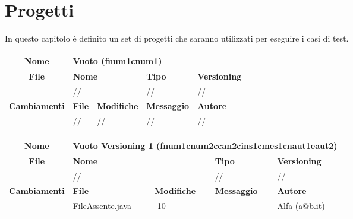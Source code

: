 \chapter{Progetti}
In questo capitolo è definito un set di progetti che saranno utilizzati per eseguire i casi di test.

\begin{table}[ht]
\footnotesize
\begin{tabular}{|c|p{2.5cm}|p{2cm}|p{2.5cm}|p{2.5cm}|}
  \hline
  \textbf{Nome}	& \multicolumn{4}{l|}{Vuoto (fnum1cnum1)} 												\\
  \hline
  \rowcolor{lightgray}\textbf{File} 		& \multicolumn{2}{l|}{\textbf{Nome}}		& \textbf{Tipo}		& \textbf{Versioning} 		\\
						\cline{2-5}
						& \multicolumn{2}{l|}{//}			& //			& //				\\
  \hline
  \rowcolor{lightgray}\textbf{Cambiamenti}	& \textbf{File}		&\textbf{Modifiche}	& \textbf{Messaggio}	& \textbf{Autore}		\\
						\cline{2-5}
						& //			& //  			& //			& //				\\
  \hline
\end{tabular}
\end{table}

\begin{table}[ht]
\footnotesize
\begin{tabular}{|c|p{2.5cm}|p{2cm}|p{2.5cm}|p{2.5cm}|}
  \hline
  \textbf{Nome}	& \multicolumn{4}{l|}{Vuoto Versioning 1 (fnum1cnum2ccan2cins1cmes1cnaut1eaut2)} 							\\
  \hline
  \rowcolor{lightgray}\textbf{File} 		& \multicolumn{2}{l|}{\textbf{Nome}}		& \textbf{Tipo}		& \textbf{Versioning} 		\\
						\cline{2-5}
						& \multicolumn{2}{l|}{//}			& //			& //				\\
  \hline
  \rowcolor{lightgray}\textbf{Cambiamenti}	& \textbf{File}		&\textbf{Modifiche}	& \textbf{Messaggio}	& \textbf{Autore}		\\
						\cline{2-5}
						& FileAssente.java	& -10	  		& 			& Alfa (a@b.it)		\\
  \hline
\end{tabular}
\end{table}

